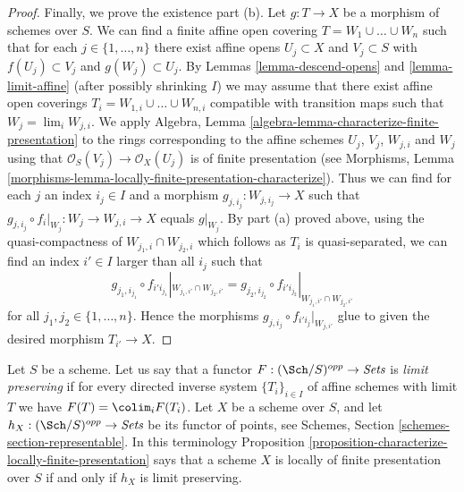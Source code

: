 \begin{proof}
\medskip\noindent
Finally, we prove the existence part (b).
Let $g : T \to X$ be a morphism of schemes over $S$.
We can find a finite affine open covering
$T = W_1 \cup \ldots \cup W_n$ such that for
each $j \in \{1, \ldots, n\}$ there exist affine opens
$U_j \subset X$ and $V_j \subset S$ with $f(U_j) \subset V_j$
and $g(W_j) \subset U_j$. By Lemmas \ref{lemma-descend-opens}
and \ref{lemma-limit-affine}
(after possibly shrinking $I$) we may assume that
there exist affine open coverings $T_i = W_{1, i} \cup \ldots \cup W_{n, i}$
compatible with transition maps such that $W_j = \lim_i W_{j, i}$.
We apply Algebra, Lemma \ref{algebra-lemma-characterize-finite-presentation}
to the rings corresponding to the affine schemes $U_j$, $V_j$, $W_{j, i}$ and
$W_j$ using that $\mathcal{O}_S(V_j) \to \mathcal{O}_X(U_j)$ is of finite
presentation (see Morphisms,
Lemma \ref{morphisms-lemma-locally-finite-presentation-characterize}).
Thus we can find for each $j$ an index $i_j \in I$ and a morphism
$g_{j, i_j} : W_{j, i_j} \to X$ such that
$g_{j, i_j} \circ f_i|_{W_j} : W_j \to W_{j, i} \to X$
equals $g|_{W_j}$. By part (a) proved above, using the quasi-compactness of
$W_{j_1, i} \cap W_{j_2, i}$ which follows as $T_i$ is quasi-separated,
we can find an index $i' \in I$ larger than all $i_j$ such that
$$
g_{j_1, i_{j_1}} \circ f_{i'i_{j_1}}|_{W_{j_1, i'} \cap W_{j_2, i'}} =
g_{j_2, i_{j_2}} \circ f_{i'i_{j_2}}|_{W_{j_1, i'} \cap W_{j_2, i'}}
$$
for all $j_1, j_2 \in \{1, \ldots, n\}$. Hence the morphisms
$g_{j, i_j} \circ f_{i'i_j}|_{W_{j, i'}}$ glue to given the
desired morphism $T_{i'} \to X$.
\end{proof}

\begin{remark}
\label{remark-limit-preserving}
Let $S$ be a scheme. Let us say that a functor
$F : (\Sch/S)^{opp} \to \textit{Sets}$ is
{\it limit preserving} if for every directed inverse system
$\{T_i\}_{i \in I}$ of affine schemes with limit $T$ we have
$F(T) = \colim_i F(T_i)$. Let $X$ be a scheme over $S$, and
let $h_X : (\Sch/S)^{opp} \to \textit{Sets}$ be its
functor of points, see
Schemes, Section \ref{schemes-section-representable}.
In this terminology
Proposition \ref{proposition-characterize-locally-finite-presentation}
says that a scheme $X$ is locally of finite presentation over
$S$ if and only if $h_X$ is limit preserving.
\end{remark}









